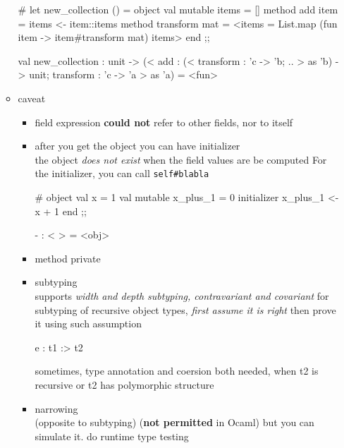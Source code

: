 \begin{enumerate}[(a)]
\begin{itemize}
\begin{redcode}
#   let new_collection () = 
    object 
      val mutable items = [] 
      method add item = items <- item::items
      method transform mat = 
        {<items = List.map (fun item -> item#transform mat) items>}
    end ;;
  \end{redcode}

\begin{bluecode}  
  val new_collection :
  unit ->
  (< add : (< transform : 'c -> 'b; .. > as 'b) -> unit;
     transform : 'c -> 'a >
   as 'a) =
  <fun>
\end{bluecode}

  \item caveat
    \begin{itemize}
    \item field expression \textbf{could not} refer to other fields, nor to itself
    \item after you get the object you can have initializer \\
      the object \textit{does not exist} when the field values are be computed
      For the initializer, you can call \verb|self#blabla|

\begin{redcode}
#   object 
    val x = 1 
    val mutable x_plus_1 = 0 
    initializer 
      x_plus_1 <- x + 1 
end ;;
\end{redcode}

\begin{bluecode}
- : <  > = <obj>
\end{bluecode}


    \item method private
    \item subtyping \\
      supports \textit{width and depth subtyping, contravariant and covariant}
      for subtyping of recursive object types, \textit{first assume it is right}
      then prove it using such assumption

\begin{bluecode}
  e : t1 :> t2
\end{bluecode}

sometimes, type annotation and coersion both needed, when t2 is recursive or t2 has polymorphic structure 


    \item narrowing \\ (opposite to subtyping) (\textbf{not permitted} in Ocaml)
      but you can simulate it. do runtime type testing


\end{itemize}
\end{itemize}
\end{enumerate}
